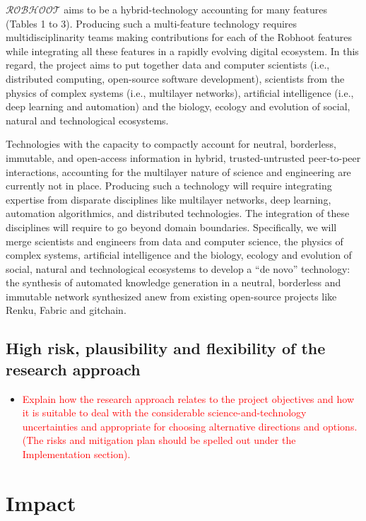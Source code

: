 \documentclass[12pt, a4paper]{article} %
\begin{document}
{\bf $\mathcal{ROBHOOT}$} aims to be a hybrid-technology
accounting for many features (Tables 1 to 3). Producing such a
multi-feature technology requires multidisciplinarity teams making
contributions for each of the Robhoot features while integrating all
these features in a rapidly evolving digital ecosystem. In this
regard, the project aims to put together data and computer scientists
(i.e., distributed computing, open-source software development),
scientists from the physics of complex systems (i.e., multilayer
networks), artificial intelligence (i.e., deep learning and
automation) and the biology, ecology and evolution of social, natural
and technological ecosystems.

Technologies with the capacity to compactly account for neutral,
borderless, immutable, and open-access information in hybrid,
trusted-untrusted peer-to-peer interactions, accounting for the
multilayer nature of science and engineering are currently not in
place. Producing such a technology will require integrating expertise
from disparate disciplines like multilayer networks, deep learning,
automation algorithmics, and distributed technologies. The integration
of these disciplines will require to go beyond domain
boundaries. Specifically, we will merge scientists and engineers from
data and computer science, the physics of complex systems, artificial
intelligence and the biology, ecology and evolution of social, natural
and technological ecosystems to develop a “de novo” technology: the
synthesis of automated knowledge generation in a neutral, borderless
and immutable network synthesized anew from existing open-source
projects like Renku, Fabric and gitchain.


\subsection{High risk, plausibility and flexibility of the research approach}


\begin{itemize}
\item \textcolor{red}{Explain how the research approach relates to the
    project objectives and how it is suitable to deal with the
    considerable science-and-technology uncertainties and appropriate
    for choosing alternative directions and options. (The risks and
    mitigation plan should be spelled out under the Implementation
    section).}
\end{itemize}

\section{Impact}
\end{document}
